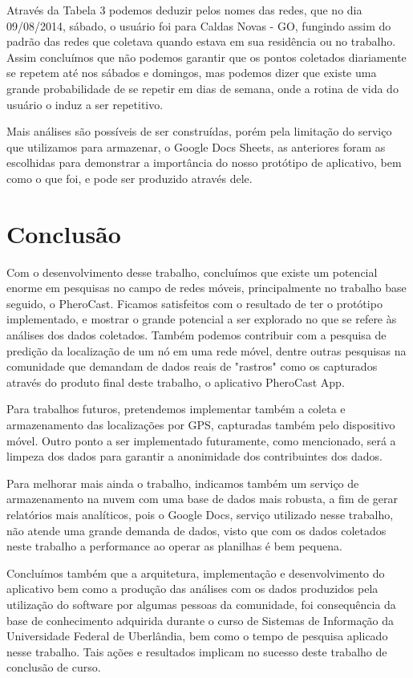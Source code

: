 \documentclass[12pt, %
openright, 
oneside,
a4paper,
brazil]{facom-ufu-abntex2}
\begin{document}
Através da Tabela 3 podemos deduzir pelos nomes das redes, que no dia 09/08/2014, sábado, o usuário foi para Caldas Novas - GO, fungindo  assim do padrão das redes que coletava quando estava em sua residência ou no trabalho. Assim concluímos que não podemos garantir que os pontos coletados diariamente se repetem até nos sábados e domingos, mas podemos dizer que existe uma grande probabilidade de se repetir em dias de semana, onde a rotina de vida do usuário o induz a ser repetitivo.


Mais análises são possíveis de ser construídas, porém pela limitação do serviço que utilizamos para armazenar, o Google Docs Sheets, as anteriores foram as escolhidas para demonstrar a importância do nosso protótipo de aplicativo, bem como o que foi, e pode ser produzido através dele.



\chapter{Conclusão}


Com o desenvolvimento desse trabalho, concluímos que existe um potencial enorme em pesquisas no campo de redes móveis, principalmente no trabalho base seguido, o PheroCast. Ficamos satisfeitos com o resultado de ter o protótipo implementado, e mostrar o grande potencial a ser explorado no que se refere às análises dos dados coletados. Também podemos contribuir com a pesquisa de predição da localização de um nó em uma rede móvel, dentre outras pesquisas na comunidade que demandam de dados reais de "rastros"   como os capturados através do produto final deste trabalho, o aplicativo PheroCast App.


Para trabalhos futuros, pretendemos implementar também a coleta e armazenamento das localizações por GPS, capturadas também pelo dispositivo móvel. Outro ponto a ser implementado futuramente, como mencionado, será a limpeza dos dados para garantir a anonimidade dos contribuintes dos dados.

Para melhorar mais ainda o trabalho, indicamos também um serviço de armazenamento na nuvem com uma base de dados mais robusta, a fim de gerar relatórios mais analíticos, pois o Google Docs, serviço utilizado nesse trabalho, não atende uma grande demanda de dados, visto que com os dados coletados neste trabalho a performance ao operar as planilhas é bem pequena. 

Concluímos também que a arquitetura, implementação e desenvolvimento do aplicativo bem como a produção das análises com os dados produzidos pela utilização do software por algumas pessoas da comunidade, foi consequência da base de conhecimento adquirida durante o curso de Sistemas de Informação da Universidade Federal de Uberlândia, bem como o tempo de pesquisa aplicado nesse trabalho. Tais ações e resultados implicam no sucesso deste trabalho de conclusão de curso.
\end{document}
